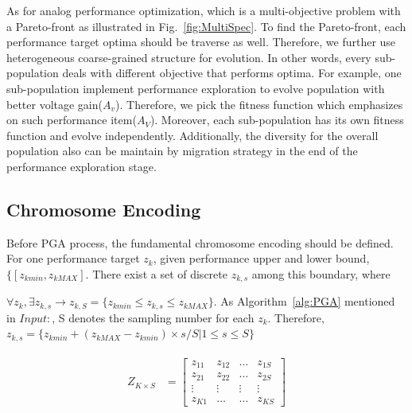       As for analog performance optimization, which is a multi-objective problem with a Pareto-front as illustrated in Fig.~\ref{fig:MultiSpec}. To find the Pareto-front, each performance target optima should be traverse as well. Therefore, we further use heterogeneous coarse-grained structure for evolution. In other words, every sub-population deals with different objective that performs optima. For example, one sub-population implement performance exploration to evolve population with better voltage gain($A_v$). Therefore, we pick the fitness function which emphasizes on such performance item($A_V$). Moreover, each sub-population has its own fitness function and evolve independently. Additionally, the diversity for the overall population also can be maintain by migration strategy in the end of the performance exploration stage.

    \subsection{Chromosome Encoding}

      Before PGA process, the fundamental chromosome encoding should be defined. For one performance target $z_k$, given performance upper and lower bound, $\{\left [z_{kmin},z_{kMAX} \right]$. There exist a set of discrete $z_{k,s}$ among this boundary, where 
      \begin{defi}\label{def:Z}
        $\forall z_k, \exists z_{k,s} \to z_{k,S} = \{z_{kmin} \leq z_{k,s} \leq z_{kMAX}\}$. As Algorithm~\ref{alg:PGA} mentioned in $Input:$, S denotes the sampling number for each $z_k$. Therefore, $z_{k,s} = \{z_{kmin} + ({z_{kMAX}-z_{kmin}})\times s/S | 1 \leq s \leq S\}$
      \end{defi}

      \begin{align}\label{eq:PerfMatrix}
        \begin{array}{rl}
          Z_{K \times S} & = 
              \left[\begin{array}{cccc}
               z_{11} & z_{12} & \dots  & z_{1S} \\
               z_{21} & z_{22} & \dots  & z_{2S} \\
               \vdots & \vdots & \vdots & \vdots  \\
               z_{K1} & \dots  & \dots  & z_{KS} 
            \end{array}\right]
        \end{array}
      \end{align}
   
